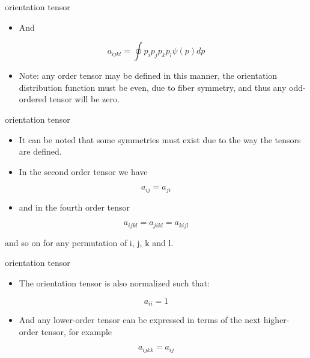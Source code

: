 \documentclass[
  letterpaper,
  ignorenonframetext,
  aspectratio=43,
  handout,
  12pt]{beamer}
\providecommand{\tightlist}{%
  \setlength{\itemsep}{0pt}\setlength{\parskip}{0pt}}
\providecommand{\tightlist}{%
\setlength{\itemsep}{0pt}\setlength{\parskip}{0pt}}
\begin{document}
\begin{frame}{orientation tensor}
\protect\hypertarget{orientation-tensor-1}{}
\begin{itemize}
\tightlist
\item
  And
\end{itemize}

\[a_{ijkl} = \oint p_i p_j p_k p_l\psi(p) dp\]

\begin{itemize}
\tightlist
\item
  Note: any order tensor may be defined in this manner, the orientation
  distribution function must be even, due to fiber symmetry, and thus
  any odd-ordered tensor will be zero.
\end{itemize}
\end{frame}

\begin{frame}{orientation tensor}
\protect\hypertarget{orientation-tensor-2}{}
\begin{itemize}
\tightlist
\item
  It can be noted that some symmetries must exist due to the way the
  tensors are defined.
\item
  In the second order tensor we have
\end{itemize}

\[a_{ij} = a_{ji}\]

\begin{itemize}
\tightlist
\item
  and in the fourth order tensor
\end{itemize}

\[a_{ijkl} = a_{jikl} = a_{kijl}\]

and so on for any permutation of i, j, k and l.
\end{frame}

\begin{frame}{orientation tensor}
\protect\hypertarget{orientation-tensor-3}{}
\begin{itemize}
\tightlist
\item
  The orientation tensor is also normalized such that:
\end{itemize}

\[a_{ii} = 1\]

\begin{itemize}
\tightlist
\item
  And any lower-order tensor can be expressed in terms of the next
  higher-order tensor, for example
\end{itemize}

\[a_{ijkk} = a_{ij}\]
\end{frame}
\end{document}
